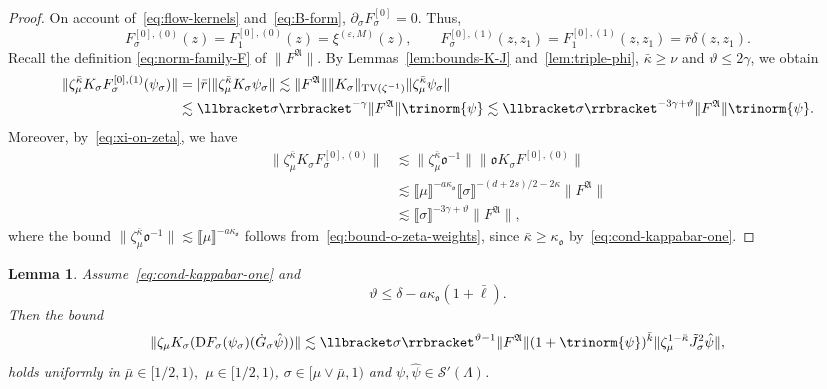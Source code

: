 \documentclass{article}
\numberwithin{equation}{section}
\newcommand{\mathD}{\mathrm{D}}
\theoremstyle{plain}
\newtheorem{lemma}[theorem]{Lemma}
\theoremstyle{definition}
\begin{document}
\begin{proof}
  On account of~\eqref{eq:flow-kernels} and~\eqref{eq:B-form},
  $\partial_{\sigma} F^{[0]}_{\sigma} = 0$. Thus,
  \[ F^{[0], (0)}_{\sigma} (z) = F^{[0], (0)}_1 (z) = \xi^{(\varepsilon, M)}
     (z), \qquad F^{[0], (1)}_{\sigma} (z, z_1) = F^{[0], (1)}_1 (z, z_1) =
     \bar{r} \delta (z, z_1) . \]
  Recall the definition \eqref{eq:norm-family-F} of $\| F^{\mathfrak{A}} \|$.
  By Lemmas~\ref{lem:bounds-K-J} and~\ref{lem:triple-phi}, $\bar{\kappa}
  \geqslant \nu$ and $\vartheta \leqslant 2 \gamma$, we obtain
  \begin{align*}
    \| \zeta_{\mu}^{\bar{\kappa}} K_{\sigma} F^{[0], (1)}_{\sigma}
    (\psi_{\sigma}) \| &=  | \bar{r} |  \|
    \zeta_{\mu}^{\bar{\kappa}} K_{\sigma} \psi_{\sigma} \| \lesssim \|
    F^{\mathfrak{A}} \|  \| K_{\sigma} \|_{\operatorname{TV} (\zeta^{- 1})}  \|
    \zeta_{\mu}^{\bar{\kappa}} \psi_{\sigma} \|\\
 &\lesssim  \llbracket \sigma \rrbracket^{- \gamma}  \| F^{\mathfrak{A}}
    \|  \trinorm{ \psi } \lesssim \llbracket \sigma \rrbracket^{-
    3 \gamma + \vartheta}  \| F^{\mathfrak{A}} \|  \trinorm{ \psi
    } .
  \end{align*}
  Moreover, by~\eqref{eq:xi-on-zeta}, we have
  \begin{align*}
     \| \zeta_{\mu}^{\bar{\kappa}} K_{\sigma} F^{[0], (0)}_{\sigma} \|
     &\lesssim \| \zeta_{\mu}^{\bar{\kappa}} \mathfrak{o}^{- 1} \|
     \| \mathfrak{o}K_{\sigma} F^{[0], (0)} \|\\
     &\lesssim \llbracket \mu \rrbracket^{- a \kappa_{\mathfrak{o}}}
     \llbracket \sigma \rrbracket^{- (d + 2 s) / 2 - 2 \kappa}
     \| F^{\mathfrak{A}} \|\\
     &\lesssim \llbracket \sigma \rrbracket^{- 3 \gamma + \vartheta}
     \| F^{\mathfrak{A}} \|,
  \end{align*}
  where the bound $\| \zeta_{\mu}^{\bar{\kappa}} \mathfrak{o}^{- 1} \|
  \lesssim \llbracket \mu \rrbracket^{- a
  \kappa_{\mathfrak{o}}}$ follows
  from~\eqref{eq:bound-o-zeta-weights}, since $\bar{\kappa} \geqslant
  \kappa_{\mathfrak{o}}$ by~\eqref{eq:cond-kappabar-one}.
\end{proof}

\begin{lemma}
  \label{lem:estimates-DF}Assume~\eqref{eq:cond-kappabar-one} and
  \begin{equation}
    \vartheta \leqslant \delta - a \kappa_{\mathfrak{o}} (1 + \bar{\ell}) .
    \label{eq:DF-bound}
  \end{equation}
  Then the bound
  \[ \| \zeta_{\mu} K_{\sigma} (\mathD F_{\sigma} (\psi_{\sigma})
     (\dot{G}_{\sigma} \hat{\psi})) \| \lesssim \llbracket \sigma
     \rrbracket^{\vartheta - 1}  \| F^{\mathfrak{A}} \|  (1 + \trinorm{ \psi
     })^{\bar{k}}  \| \zeta_{\mu}^{1 - \bar{\kappa}} \tilde{J
     }_{\sigma}^2 \hat{\psi} \|, \]
  holds uniformly in $\bar{\mu} \in [1 / 2, 1),$ $\mu \in [1 / 2, 1)$, $\sigma
  \in [\mu \vee \bar{\mu}, 1)$ and $\psi, \hat{\psi} \in \mathcal{S}'
  (\Lambda)$.
\end{lemma}
\end{document}
